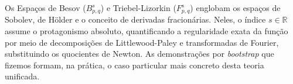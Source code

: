 \documentclass[cs_edp_2026.1.tex]{subfiles} %
\begin{document}
{	Os Espaços de Besov ($B^s_{p,q}$) e Triebel-Lizorkin ($F^s_{p,q}$) englobam os espaços de Sobolev, de Hölder e o conceito de derivadas fracionárias. Neles, o índice $s \in \mathbb{R}$ assume o protagonismo absoluto, quantificando a regularidade exata da função por meio de decomposições de Littlewood-Paley e transformadas de Fourier, substituindo os quocientes de Newton. As demonstrações por \textit{bootstrap} que fizemos formam, na prática, o caso particular mais concreto desta teoria unificada.
}

\end{document}
